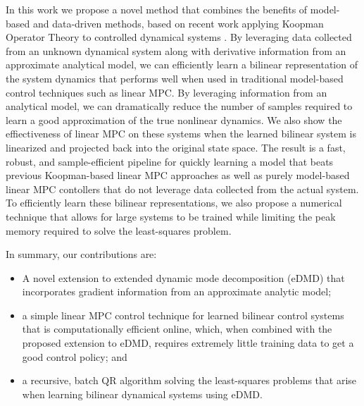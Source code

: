\documentclass{article}
\begin{document}
    In this work we propose a novel method that combines the benefits of model-based and
    data-driven methods, based on recent work  applying Koopman Operator Theory to
    controlled dynamical systems 
    \cite{Meduri2022,Bruder2021,Korda2018,Folkestad2020,Suh2020}.
    By leveraging data collected from an
    unknown dynamical system along with derivative information from an approximate
    analytical model, we can efficiently learn a bilinear representation of the system
    dynamics that performs well when used in traditional model-based control techniques such
    as linear MPC. By leveraging information from an analytical model, we can dramatically
    reduce the number of samples required to learn a good approximation of the true
    nonlinear dynamics. We also show the effiectiveness of linear MPC on these systems 
    when the learned bilinear system is linearized and projected back into the original 
    state space. The result is a fast, robust, and sample-efficient pipeline for quickly 
    learning a model that beats previous Koopman-based linear MPC approaches as well as 
    purely model-based linear MPC contollers that do not leverage data collected from the 
    actual system. To efficiently learn these bilinear representations, we also propose 
    a numerical technique that allows for large systems to be trained while limiting the 
    peak memory required to solve the least-squares problem.

    In summary, our contributions are:
    \begin{itemize}
        \item A novel extension to extended dynamic mode decomposition (eDMD) that
        incorporates gradient information from an approximate analytic model;

        \item a simple linear MPC control technique for learned bilinear control systems
        that is computationally efficient online, which, when combined with the proposed
        extension to eDMD, requires extremely little training data to get a good control
        policy; and

        \item a recursive, batch QR algorithm solving the least-squares problems that arise 
        when learning bilinear dynamical systems using eDMD.
    \end{itemize}
    
\end{document}

